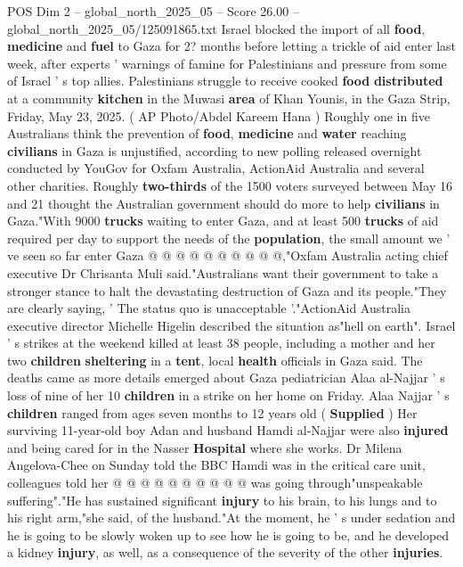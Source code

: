\begin{textsample}{POS Dim 2 – global\_north\_2025\_05 – Score 26.00 – global\_north\_2025\_05/125091865.txt}  \label{ex:f2_pos_219}
Israel blocked the import of all \textbf{food}, \textbf{medicine} and \textbf{fuel} to Gaza for 2? months before letting a trickle of aid enter last week, after experts ' warnings of famine for Palestinians and pressure from some of Israel ' s top allies.
Palestinians struggle to receive cooked \textbf{food} \textbf{distributed} at a community \textbf{kitchen} in the Muwasi \textbf{area} of Khan Younis, in the Gaza Strip, Friday, May 23, 2025. ( AP Photo/Abdel Kareem Hana ) Roughly one in five Australians think the prevention of \textbf{food}, \textbf{medicine} and \textbf{water} reaching \textbf{civilians} in Gaza is unjustified, according to new polling released overnight conducted by YouGov for Oxfam Australia, ActionAid Australia and several other charities.
Roughly \textbf{two-thirds} of the 1500 voters surveyed between May 16 and 21 thought the Australian government should do more to help \textbf{civilians} in Gaza."With 9000 \textbf{trucks} waiting to enter Gaza, and at least 500 \textbf{trucks} of aid required per day to support the needs of the \textbf{population}, the small amount we ' ve seen so far enter Gaza @ @ @ @ @ @ @ @ @ @,"Oxfam Australia acting chief executive Dr Chrisanta Muli said."Australians want their government to take a stronger stance to halt the devastating destruction of Gaza and its people."They are clearly saying, ' The status quo is unacceptable '."ActionAid Australia executive director Michelle Higelin described the situation as"hell on earth".
Israel ' s strikes at the weekend killed at least 38 people, including a mother and her two \textbf{children} \textbf{sheltering} in a \textbf{tent}, local \textbf{health} officials in Gaza said.
The deaths came as more details emerged about Gaza pediatrician Alaa al-Najjar ' s loss of nine of her 10 \textbf{children} in a strike on her home on Friday.
Alaa Najjar ' s \textbf{children} ranged from ages seven months to 12 years old ( \textbf{Supplied} ) Her surviving 11-year-old boy Adan and husband Hamdi al-Najjar were also \textbf{injured} and being cared for in the Nasser \textbf{Hospital} where she works.
Dr Milena Angelova-Chee on Sunday told the BBC Hamdi was in the critical care unit, colleagues told her @ @ @ @ @ @ @ @ @ @ was going through"unspeakable suffering"."He has sustained significant \textbf{injury} to his brain, to his lungs and to his right arm,"she said, of the husband."At the moment, he ' s under sedation and he is going to be slowly woken up to see how he is going to be, and he developed a kidney \textbf{injury}, as well, as a consequence of the severity of the other \textbf{injuries}.

\end{textsample}
